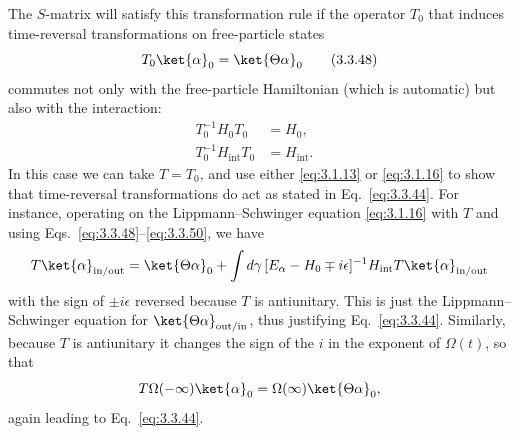 The $S$-matrix will satisfy this transformation rule if the operator $T_0$ that
induces time-reversal transformations on free-particle states
\begin{equation}
T_0\ket{\alpha}_0=\ket{\Theta\alpha}_0
\tag{3.3.48}\label{eq:3.3.48}
\end{equation}
commutes not only with the free-particle Hamiltonian (which is automatic) but also
with the interaction:
\begin{align}
T_0^{-1}H_0T_0&=H_0,
&\tag{3.3.49}\label{eq:3.3.49}\\
T_0^{-1}H_{\mathrm{int}}T_0&=H_{\mathrm{int}}.
&\tag{3.3.50}\label{eq:3.3.50}
\end{align}
In this case we can take $T=T_0$, and use either \eqref{eq:3.1.13} or \eqref{eq:3.1.16} to show that
time-reversal transformations do act as stated in Eq.~\eqref{eq:3.3.44}. For instance,
operating on the Lippmann--Schwinger equation \eqref{eq:3.1.16} with $T$ and using
Eqs.~\eqref{eq:3.3.48}--\eqref{eq:3.3.50}, we have
\[
T\ket{\alpha}_{\mathrm{in/out}}
=\ket{\Theta\alpha}_0+\int d\gamma\,
[E_\alpha-H_0\mp i\epsilon]^{-1}H_{\mathrm{int}}
T\ket{\alpha}_{\mathrm{in/out}}
\]
with the sign of $\pm i\epsilon$ reversed because $T$ is antiunitary. This is just
the Lippmann--Schwinger equation for $\ket{\Theta\alpha}_{\mathrm{out/in}}$, thus
justifying Eq.~\eqref{eq:3.3.44}. Similarly, because $T$ is antiunitary it changes the sign
of the $i$ in the exponent of $\Omega(t)$, so that
\[
T\Omega(-\infty)\ket{\alpha}_0=\Omega(\infty)\ket{\Theta\alpha}_0,
\]
again leading to Eq.~\eqref{eq:3.3.44}.

